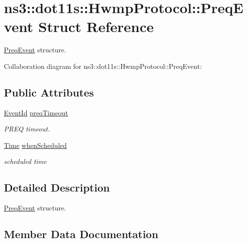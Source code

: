 \hypertarget{structns3_1_1dot11s_1_1HwmpProtocol_1_1PreqEvent}{}\section{ns3\+:\+:dot11s\+:\+:Hwmp\+Protocol\+:\+:Preq\+Event Struct Reference}
\label{structns3_1_1dot11s_1_1HwmpProtocol_1_1PreqEvent}


\hyperlink{structns3_1_1dot11s_1_1HwmpProtocol_1_1PreqEvent}{Preq\+Event} structure.  




Collaboration diagram for ns3\+:\+:dot11s\+:\+:Hwmp\+Protocol\+:\+:Preq\+Event\+:
\subsection*{Public Attributes}
\begin{DoxyCompactItemize}
\item 
\hyperlink{classns3_1_1EventId}{Event\+Id} \hyperlink{structns3_1_1dot11s_1_1HwmpProtocol_1_1PreqEvent_ad31ca9c3bed08b8a0818350b6681c342}{preq\+Timeout}
\begin{DoxyCompactList}\small\item\em P\+R\+EQ timeout. \end{DoxyCompactList}\item 
\hyperlink{classns3_1_1Time}{Time} \hyperlink{structns3_1_1dot11s_1_1HwmpProtocol_1_1PreqEvent_aeac1e9e975279f5bd8762bceafe1b2c2}{when\+Scheduled}
\begin{DoxyCompactList}\small\item\em scheduled time \end{DoxyCompactList}\end{DoxyCompactItemize}


\subsection{Detailed Description}
\hyperlink{structns3_1_1dot11s_1_1HwmpProtocol_1_1PreqEvent}{Preq\+Event} structure. 

\subsection{Member Data Documentation}

